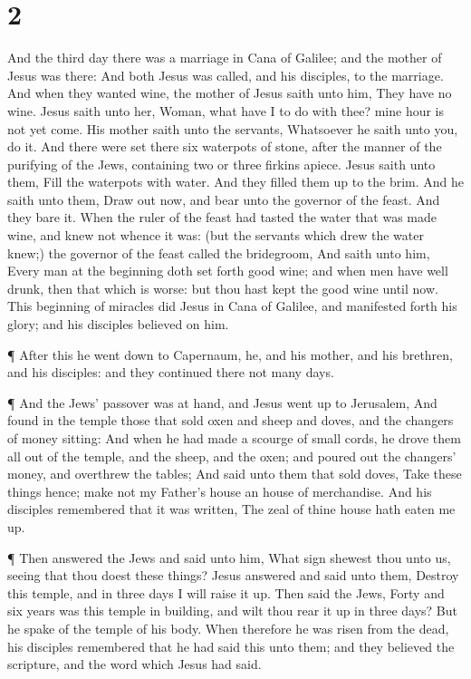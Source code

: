 \hypertarget{section-1}{%
\section{2}\label{section-1}}

 And the third day there was a marriage in Cana of Galilee;
and the mother of Jesus was there:  And both Jesus was
called, and his disciples, to the marriage.  And when they
wanted wine, the mother of Jesus saith unto him, They have no wine.
 Jesus saith unto her, Woman, what have I to do with thee?
mine hour is not yet come.  His mother saith unto the
servants, Whatsoever he saith unto you, do it.  And there
were set there six waterpots of stone, after the manner of the purifying
of the Jews, containing two or three firkins apiece.  Jesus
saith unto them, Fill the waterpots with water. And they filled them up
to the brim.  And he saith unto them, Draw out now, and bear
unto the governor of the feast. And they bare it.  When the
ruler of the feast had tasted the water that was made wine, and knew not
whence it was: (but the servants which drew the water knew;) the
governor of the feast called the bridegroom,  And saith
unto him, Every man at the beginning doth set forth good wine; and when
men have well drunk, then that which is worse: but thou hast kept the
good wine until now.  This beginning of miracles did Jesus
in Cana of Galilee, and manifested forth his glory; and his disciples
believed on him.

 ¶ After this he went down to Capernaum, he, and his
mother, and his brethren, and his disciples: and they continued there
not many days.

 ¶ And the Jews' passover was at hand, and Jesus went up to
Jerusalem,  And found in the temple those that sold oxen
and sheep and doves, and the changers of money sitting: 
And when he had made a scourge of small cords, he drove them all out of
the temple, and the sheep, and the oxen; and poured out the changers'
money, and overthrew the tables;  And said unto them that
sold doves, Take these things hence; make not my Father's house an house
of merchandise.  And his disciples remembered that it was
written, The zeal of thine house hath eaten me up.

 ¶ Then answered the Jews and said unto him, What sign
shewest thou unto us, seeing that thou doest these things? 
Jesus answered and said unto them, Destroy this temple, and in three
days I will raise it up.  Then said the Jews, Forty and six
years was this temple in building, and wilt thou rear it up in three
days?  But he spake of the temple of his body.
 When therefore he was risen from the dead, his disciples
remembered that he had said this unto them; and they believed the
scripture, and the word which Jesus had said.

